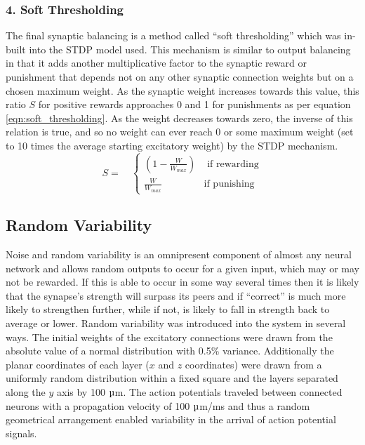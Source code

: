 \documentclass[11pt, twocolumn]{article}
\begin{document}
\subsubsection*{4. Soft Thresholding}
The final synaptic balancing is a method called ``soft thresholding'' which was in-built into the \acs{STDP} model used. This mechanism is similar to output balancing in that it adds another multiplicative factor to the synaptic reward or punishment that depends not on any other synaptic connection weights but on a chosen maximum weight. As the synaptic weight increases towards this value, this ratio $S$ for positive rewards approaches 0 and 1 for punishments as per equation \ref{eqn:soft_thresholding}. As the weight decreases towards zero, the inverse of this relation is true, and so no weight can ever reach 0 or some maximum weight (set to 10 times the average starting excitatory weight) by the \acs{STDP} mechanism.
\begin{equation}
	S = \quad
	\begin{cases} 
	(1-\frac{W}{W_{max}}) & \text{ if rewarding} \\
	\frac{W}{W_{max}} & \text{if punishing}
	\end{cases}
	\label{eqn:soft_thresholding}
\end{equation}


\subsection*{Random Variability}
Noise and random variability is an omnipresent component of almost any neural network and allows random outputs to occur for a given input, which may or may not be rewarded. If this is able to occur in some way several times then it is likely that the synapse's strength will surpass its peers and if ``correct'' is much more likely to strengthen further, while if not, is likely to fall in strength back to average or lower. Random variability was introduced into the system in several ways. The initial weights of the excitatory connections were drawn from the absolute value of a normal distribution with 0.5\% variance. Additionally the planar coordinates of each layer ($x$ and $z$ coordinates) were drawn from a uniformly random distribution within a fixed square and the layers separated along the $y$ axis by 100 $\micro$m. The action potentials traveled between connected neurons with a propagation velocity of 100 $\micro$m/ms and thus a random geometrical arrangement enabled variability in the arrival of action potential signals.
\end{document}
